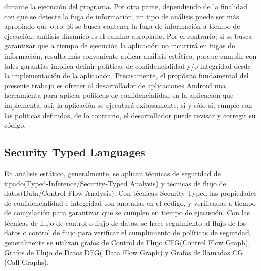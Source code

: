 durante la ejecución del programa.\newline
Por otra parte, dependiendo de la finalidad con que se detecte la fuga de
información, un tipo de análisis puede ser más apropiado que otro. Si se busca
contener la fuga de información a tiempo de ejecución, análisis dinámico es el
camino apropiado. Por el contrario, si se busca garantizar que a tiempo de
ejecución la aplicación no incurrirá en fugas de información, resulta más
conveniente aplicar análisis estático, porque cumplir con tales garantías
implica definir políticas de confidencialidad y/o integridad desde la
implementación de la aplicación.\newline 
Precisamente, el propósito fundamental del presente trabajo es ofrecer al
desarrollador de aplicaciones Android una herramienta para aplicar políticas de
confidencialidad en la aplicación que implementa, así, la aplicación se
ejecutará exitosamente, si y sólo si, cumple con las políticas definidas, de lo
contrario, el desarrollador puede revisar y corregir su código.\newline
 
\subsection{Security Typed Languages} 
En análisis estático, generalmente, se aplican técnicas de seguridad de
tipado(Typed-Inference/Security-Typed Analysis) y técnicas de flujo de
datos(Data/Control Flow Analysis). Con técnicas Security-Typed las propiedades
de confidencialidad e integridad son anotadas en el código, y verificadas a
tiempo de compilación para garantizar que se cumplen en tiempo de ejecución. Con
las técnicas de flujo de control o flujo de datos, se hace seguimiento al flujo
de los datos o control de flujo para verificar el cumplimiento de políticas de
seguridad, generalmente se utilizan grafos de Control de Flujo CFG(Control Flow
Graph), Grafos de Flujo de Datos DFG( Data Flow Graph) y Grafos de llamadas CG
(Call Graphs).\newline 

